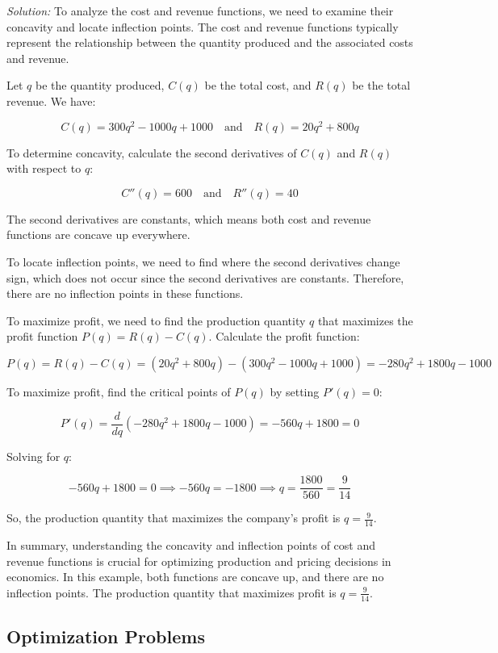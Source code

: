 \documentclass[a4paper,12pt]{book}
\newenvironment{solution}[1][]
{\par\noindent\textit{Solution:} \rmfamily}{\medskip}
\newcounter{example}
\begin{document}
\begin{solution}
To analyze the cost and revenue functions, we need to examine their concavity and locate inflection points. The cost and revenue functions typically represent the relationship between the quantity produced and the associated costs and revenue.

Let \(q\) be the quantity produced, \(C(q)\) be the total cost, and \(R(q)\) be the total revenue. We have:

\[
C(q) = 300q^2 - 1000q + 1000 \quad \text{and} \quad R(q) = 20q^2 + 800q
\]

To determine concavity, calculate the second derivatives of \(C(q)\) and \(R(q)\) with respect to \(q\):

\[
C''(q) = 600 \quad \text{and} \quad R''(q) = 40
\]

The second derivatives are constants, which means both cost and revenue functions are concave up everywhere.

To locate inflection points, we need to find where the second derivatives change sign, which does not occur since the second derivatives are constants. Therefore, there are no inflection points in these functions.

To maximize profit, we need to find the production quantity \(q\) that maximizes the profit function \(P(q) = R(q) - C(q)\). Calculate the profit function:

\[
P(q) = R(q) - C(q) = (20q^2 + 800q) - (300q^2 - 1000q + 1000) = -280q^2 + 1800q - 1000
\]

To maximize profit, find the critical points of \(P(q)\) by setting \(P'(q) = 0\):

\[
P'(q) = \frac{d}{dq}(-280q^2 + 1800q - 1000) = -560q + 1800 = 0
\]

Solving for \(q\):

\[
-560q + 1800 = 0 \implies -560q = -1800 \implies q = \frac{1800}{560} = \frac{9}{14}
\]

So, the production quantity that maximizes the company's profit is \(q = \frac{9}{14}\).

In summary, understanding the concavity and inflection points of cost and revenue functions is crucial for optimizing production and pricing decisions in economics. In this example, both functions are concave up, and there are no inflection points. The production quantity that maximizes profit is \(q = \frac{9}{14}\).
\end{solution}

\subsection{Optimization Problems}
\end{document}
